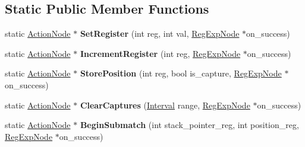 \subsection*{Static Public Member Functions}
\begin{DoxyCompactItemize}
\item 
static \hyperlink{classv8_1_1internal_1_1_action_node}{Action\+Node} $\ast$ {\bfseries Set\+Register} (int reg, int val, \hyperlink{classv8_1_1internal_1_1_reg_exp_node}{Reg\+Exp\+Node} $\ast$on\+\_\+success)\hypertarget{classv8_1_1internal_1_1_action_node_ab0232aafb29641c830970993c18ca5a7}{}\label{classv8_1_1internal_1_1_action_node_ab0232aafb29641c830970993c18ca5a7}

\item 
static \hyperlink{classv8_1_1internal_1_1_action_node}{Action\+Node} $\ast$ {\bfseries Increment\+Register} (int reg, \hyperlink{classv8_1_1internal_1_1_reg_exp_node}{Reg\+Exp\+Node} $\ast$on\+\_\+success)\hypertarget{classv8_1_1internal_1_1_action_node_ac2fea920241e4412a3bba2d10acb91ef}{}\label{classv8_1_1internal_1_1_action_node_ac2fea920241e4412a3bba2d10acb91ef}

\item 
static \hyperlink{classv8_1_1internal_1_1_action_node}{Action\+Node} $\ast$ {\bfseries Store\+Position} (int reg, bool is\+\_\+capture, \hyperlink{classv8_1_1internal_1_1_reg_exp_node}{Reg\+Exp\+Node} $\ast$on\+\_\+success)\hypertarget{classv8_1_1internal_1_1_action_node_a7b7c1ea99df9360c97a7e73e2672a834}{}\label{classv8_1_1internal_1_1_action_node_a7b7c1ea99df9360c97a7e73e2672a834}

\item 
static \hyperlink{classv8_1_1internal_1_1_action_node}{Action\+Node} $\ast$ {\bfseries Clear\+Captures} (\hyperlink{classv8_1_1internal_1_1_interval}{Interval} range, \hyperlink{classv8_1_1internal_1_1_reg_exp_node}{Reg\+Exp\+Node} $\ast$on\+\_\+success)\hypertarget{classv8_1_1internal_1_1_action_node_af5c152a32e7afbe31390f57c07eed05a}{}\label{classv8_1_1internal_1_1_action_node_af5c152a32e7afbe31390f57c07eed05a}

\item 
static \hyperlink{classv8_1_1internal_1_1_action_node}{Action\+Node} $\ast$ {\bfseries Begin\+Submatch} (int stack\+\_\+pointer\+\_\+reg, int position\+\_\+reg, \hyperlink{classv8_1_1internal_1_1_reg_exp_node}{Reg\+Exp\+Node} $\ast$on\+\_\+success)\hypertarget{classv8_1_1internal_1_1_action_node_a84297f33bee6dffd0cc7a6b5341fb106}{}\label{classv8_1_1internal_1_1_action_node_a84297f33bee6dffd0cc7a6b5341fb106}


\end{DoxyCompactItemize}

